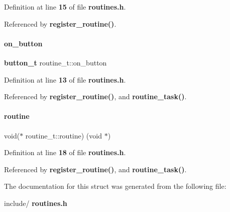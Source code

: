 Definition at line \textbf{ 15} of file \textbf{ routines.\+h}.



Referenced by \textbf{ register\+\_\+routine()}.

\mbox{\label{structroutine__t_a4600cad285b5643e422cb5bfe6ce7fa4}} 
\paragraph{on\+\_\+button}
{\footnotesize\ttfamily \textbf{ button\+\_\+t} routine\+\_\+t\+::on\+\_\+button}



Definition at line \textbf{ 13} of file \textbf{ routines.\+h}.



Referenced by \textbf{ register\+\_\+routine()}, and \textbf{ routine\+\_\+task()}.

\mbox{\label{structroutine__t_ac9915be4bb8f2415afe4bd27296cda14}} 
\paragraph{routine}
{\footnotesize\ttfamily void($\ast$ routine\+\_\+t\+::routine) (void $\ast$)}



Definition at line \textbf{ 18} of file \textbf{ routines.\+h}.



Referenced by \textbf{ register\+\_\+routine()}, and \textbf{ routine\+\_\+task()}.



The documentation for this struct was generated from the following file\+:\begin{DoxyCompactItemize}
\item 
include/\textbf{ routines.\+h}\end{DoxyCompactItemize}
